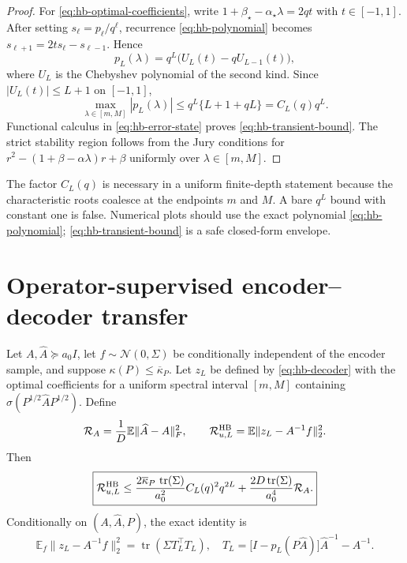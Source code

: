 \begin{proof}
For \eqref{eq:hb-optimal-coefficients}, write
$1+\beta_\star-\alpha_\star\lambda=2qt$ with $t\in[-1,1]$.
After setting $s_\ell=p_\ell/q^\ell$, recurrence
\eqref{eq:hb-polynomial} becomes
$s_{\ell+1}=2t s_\ell-s_{\ell-1}$.  Hence
\[
 p_L(\lambda)=q^L\bigl(U_L(t)-qU_{L-1}(t)\bigr),
\]
where $U_L$ is the Chebyshev polynomial of the second kind.  Since
$|U_L(t)|\leq L+1$ on $[-1,1]$,
\[
 \max_{\lambda\in[m,M]}|p_L(\lambda)|
 \leq q^L\{L+1+qL\}=C_L(q)q^L.
\]
Functional calculus in \eqref{eq:hb-error-state} proves
\eqref{eq:hb-transient-bound}.  The strict stability region follows from the
Jury conditions for
$r^2-(1+\beta-\alpha\lambda)r+\beta$ uniformly over
$\lambda\in[m,M]$.
\end{proof}

The factor $C_L(q)$ is necessary in a uniform finite-depth statement because
the characteristic roots coalesce at the endpoints $m$ and $M$.  A bare
$q^L$ bound with constant one is false.  Numerical plots should use the exact
polynomial \eqref{eq:hb-polynomial}; \eqref{eq:hb-transient-bound} is a safe
closed-form envelope.

\section{Operator-supervised encoder--decoder transfer}
\label{sec:hb-transfer}

\begin{theorem}
\label{thm:hb-transfer}
Let $A,\widehat A\succeq a_0I$, let $f\sim\mathcal N(0,\Sigma)$ be conditionally
independent of the encoder sample, and suppose
$\kappa(P)\leq\overline\kappa_P$.  Let $z_L$ be defined by
\eqref{eq:hb-decoder} with the optimal coefficients for a uniform spectral
interval $[m,M]$ containing
$\sigma(P^{1/2}\widehat A P^{1/2})$.  Define
\[
 \mathcal R_A=\frac1D\mathbb E\|\widehat A-A\|_F^2,
 \qquad
 \mathcal R_{u,L}^{\rm HB}=\mathbb E\|z_L-A^{-1}f\|_2^2.
\]
Then
\begin{equation}
 \boxed{
 \mathcal R_{u,L}^{\rm HB}
 \leq
 \frac{2\overline\kappa_P\,\operatorname{tr}(\Sigma)}{a_0^2}
 C_L(q)^2q^{2L}
 +\frac{2D\operatorname{tr}(\Sigma)}{a_0^4}\mathcal R_A.}
 \label{eq:hb-transfer}
\end{equation}
Conditionally on $(A,\widehat A,P)$, the exact identity is
\begin{equation}
 \mathbb E_f\|z_L-A^{-1}f\|_2^2
 =\operatorname{tr}\!\left(\Sigma T_L^\top T_L\right),
 \quad
 T_L=\bigl[I-p_L(P\widehat A)\bigr]\widehat A^{-1}-A^{-1}.
 \label{eq:hb-exact-trace}
\end{equation}
\end{theorem}

